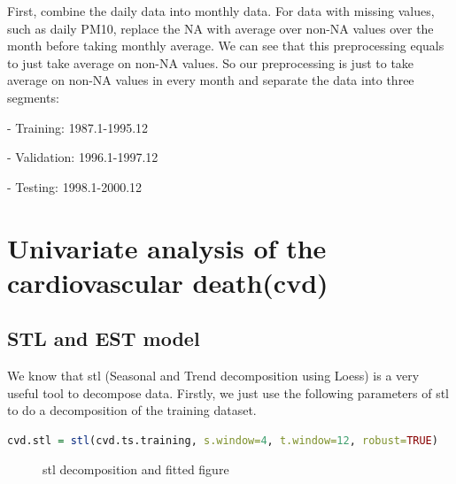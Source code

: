 \documentclass{article}
\begin{document}
First, combine the daily data into monthly data. For data with missing values, such as daily PM10, replace the NA with average over non-NA values over the month before taking monthly average. We can see that this preprocessing equals to just take average on non-NA values. So our preprocessing is just to take 
average on non-NA values in every month and separate the data into three segments:
    
    \quad - Training: 1987.1-1995.12

    \quad - Validation: 1996.1-1997.12

    \quad - Testing: 1998.1-2000.12

\vspace{4pt}
\section{Univariate analysis of the cardiovascular death(cvd)}
\subsection{STL and EST model}

We know that stl (Seasonal and Trend decomposition using Loess) is a very useful tool to decompose data. Firstly, we just use the following parameters of stl 
to do a decomposition of the training dataset.
\begin{lstlisting}[language=R]
cvd.stl = stl(cvd.ts.training, s.window=4, t.window=12, robust=TRUE)
\end{lstlisting}

\begin{figure}[H]
    \centering
    \quad
    \caption{stl decomposition and fitted figure}
    \label{stl}
\end{figure}
\end{document}
